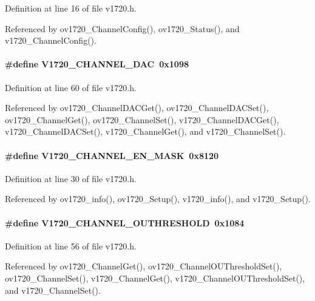 Definition at line 16 of file v1720.h.

Referenced by ov1720\_\-ChannelConfig(), ov1720\_\-Status(), and v1720\_\-ChannelConfig().
\paragraph[{V1720\_\-CHANNEL\_\-DAC}]{\setlength{\rightskip}{0pt plus 5cm}\#define V1720\_\-CHANNEL\_\-DAC~0x1098}\hfill\label{v1720_8h_a82eda84ca7f36c2c4e60347195a23dc2}


Definition at line 60 of file v1720.h.

Referenced by ov1720\_\-ChannelDACGet(), ov1720\_\-ChannelDACSet(), ov1720\_\-ChannelGet(), ov1720\_\-ChannelSet(), v1720\_\-ChannelDACGet(), v1720\_\-ChannelDACSet(), v1720\_\-ChannelGet(), and v1720\_\-ChannelSet().
\paragraph[{V1720\_\-CHANNEL\_\-EN\_\-MASK}]{\setlength{\rightskip}{0pt plus 5cm}\#define V1720\_\-CHANNEL\_\-EN\_\-MASK~0x8120}\hfill\label{v1720_8h_a544d3f131a002c8258553f40160566ec}


Definition at line 30 of file v1720.h.

Referenced by ov1720\_\-info(), ov1720\_\-Setup(), v1720\_\-info(), and v1720\_\-Setup().
\paragraph[{V1720\_\-CHANNEL\_\-OUTHRESHOLD}]{\setlength{\rightskip}{0pt plus 5cm}\#define V1720\_\-CHANNEL\_\-OUTHRESHOLD~0x1084}\hfill\label{v1720_8h_a51d77f68080a096974ac35d7e3880333}


Definition at line 56 of file v1720.h.

Referenced by ov1720\_\-ChannelGet(), ov1720\_\-ChannelOUThresholdSet(), ov1720\_\-ChannelSet(), v1720\_\-ChannelGet(), v1720\_\-ChannelOUThresholdSet(), and v1720\_\-ChannelSet().
